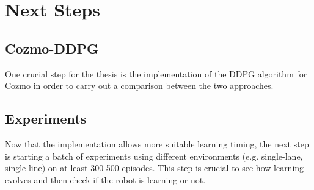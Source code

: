 \documentclass[a4paper, 11pt]{article}
\begin{document}
	\section{Next Steps}
	 
	\subsection{Cozmo-DDPG}
	
	One crucial step for the thesis is the implementation of the DDPG algorithm for Cozmo in order to carry out a comparison between the two approaches.
	
	\subsection{Experiments}
	
	Now that the implementation allows more suitable learning timing, the next step is starting a batch of experiments using different environments (e.g. single-lane, single-line) on at least 300-500 episodes. This step is crucial to see how learning evolves and then check if the robot is learning or not.
	
	
	\newpage
	
	
\end{document}
